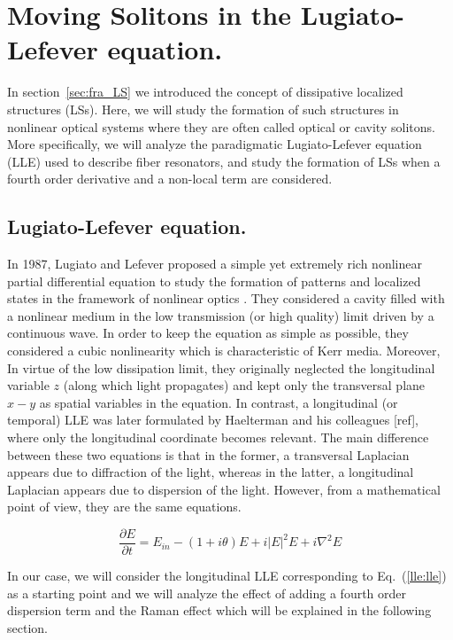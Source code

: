 \chapter{Moving Solitons in the Lugiato-Lefever equation.}

In section~\ref{sec:fra_LS} we introduced the concept of dissipative localized structures (LSs). Here, we will study the formation
of such structures in nonlinear optical systems where they are often called optical or cavity solitons. 
More specifically, we will analyze the paradigmatic Lugiato-Lefever equation (LLE) \cite{lugiatolefever1987} used to describe fiber resonators, and
study the formation of LSs when a fourth order derivative and a non-local term are considered.


\section{Lugiato-Lefever equation.}

In 1987, Lugiato and Lefever proposed a simple yet extremely rich nonlinear partial differential equation to study the formation of patterns and localized states
in the framework of nonlinear optics \cite{lugiatolefever1987}. They considered a cavity filled with a nonlinear medium in the low transmission (or high quality) limit
driven by a continuous wave. In order to keep the equation as simple as possible, they considered a cubic nonlinearity which is characteristic of Kerr media. Moreover,
In virtue of the low dissipation limit, they originally neglected the longitudinal variable $z$ (along which light propagates) and kept only the transversal plane $x-y$ as spatial
variables in the equation. In contrast, a longitudinal (or temporal) LLE was later formulated by Haelterman and his colleagues [ref], where only the longitudinal 
coordinate becomes relevant. The main difference between these two equations is that in the former, a transversal Laplacian appears due to diffraction of the light, whereas
in the latter, a longitudinal Laplacian appears due to dispersion of the light. However, from a mathematical point of view, they are the same equations.


\begin{equation}
    \dfrac{\partial E}{\partial t} = E_{in} - (1 + i\theta) E + i |E|^2 E + i\nabla^2 E
    \label{lle:lle}
\end{equation}

In our case, we will consider the longitudinal LLE corresponding to Eq.~(\ref{lle:lle}) as a starting point and we will analyze
the effect of adding a fourth order dispersion term and the Raman effect which will be explained in the following section.

